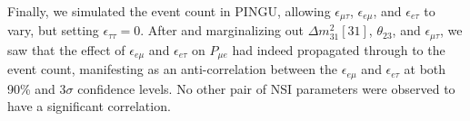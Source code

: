 \documentclass{revtex4-2}
\newcommand{\emt}{\ensuremath{\epsilon_{\mu\tau}}}
\newcommand{\eet}{\epsilon_{e\tau}}
\newcommand{\eem}{\epsilon_{e\mu}}
\newcommand{\ett}{\ensuremath{\epsilon_{\tau\tau}}}
\newcommand{\dm}{\Delta m^2_{31}}
\renewcommand{\ne}{\nu_e}
\newcommand{\nm}{\nu_\mu}
\newcommand{\Pme}{P_{\mu  e}}
\begin{document}
{{Finally, we simulated the event count in PINGU, allowing $\emt$, $\eem$, and $\eet$ to vary, but setting $\ett=0$.
After and marginalizing out $\dm[31]$, $\theta_{23}$, and $\emt$, we saw that the effect of $\eem$ and $\eet$ on $\Pme$ had indeed propagated through to the event count,
manifesting as an anti-correlation between the $\eem$ and $\eet$ at both 90\% and $3\sigma$ confidence levels. No other pair of NSI parameters were observed to have 
a significant correlation.



}}
\end{document}
